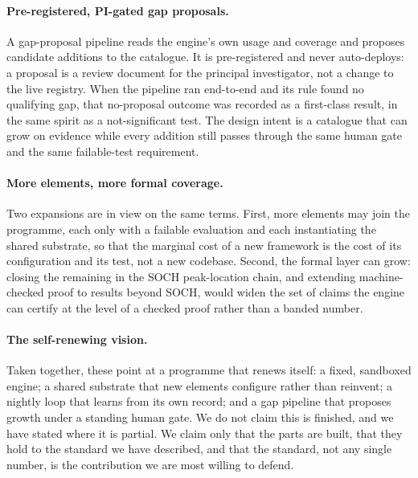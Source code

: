 \paragraph{Pre-registered, PI-gated gap proposals.} A gap-proposal pipeline reads
the engine's own usage and coverage and proposes candidate additions to the
catalogue. It is pre-registered and never auto-deploys: a proposal is a review
document for the principal investigator, not a change to the live registry. When
the pipeline ran end-to-end and its rule found no qualifying gap, that
no-proposal outcome was recorded as a first-class result, in the same spirit as a
not-significant test. The design intent is a catalogue that can grow on evidence
while every addition still passes through the same human gate and the same
failable-test requirement.

\paragraph{More elements, more formal coverage.} Two expansions are in view on the
same terms. First, more elements may join the programme, each only with a failable
evaluation and each instantiating the shared substrate, so that the marginal cost
of a new framework is the cost of its configuration and its test, not a new
codebase. Second, the formal layer can grow: closing the remaining  in
the SOCH peak-location chain, and extending machine-checked proof to results
beyond SOCH, would widen the set of claims the engine can certify at the level of
a checked proof rather than a banded number.

\paragraph{The self-renewing vision.} Taken together, these point at a programme
that renews itself: a fixed, sandboxed engine; a shared substrate that new
elements configure rather than reinvent; a nightly loop that learns from its own
record; and a gap pipeline that proposes growth under a standing human gate. We
do not claim this is finished, and we have stated where it is partial. We claim
only that the parts are built, that they hold to the standard we have described,
and that the standard, not any single number, is the contribution we are most
willing to defend.
